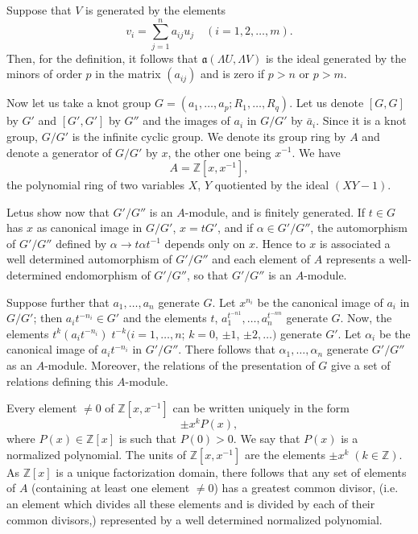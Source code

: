 Suppose that $V$ is generated by the elements  
$$
v_i = \sum^n_{j=1} a_{ij} u_j \quad (i= 1, 2, \ldots, m).
$$
Then, for the definition, it follows that $\mathfrak{a} (\Lambda U, \Lambda
V)$ is the ideal generated by the minors of order $p$ in the matrix
$(a_{ij})$ and is zero if $p> n$ or $p > m$. 

Now let us take a knot group $G = (a_1, \ldots, a_p; R_1, \ldots,
R_q)$. Let us denote $[G, G]$ by $G'$ and $[G', G']$ by $G''$ and the
images of $a_i$ in $G/G'$ by $\bar{a}_i$. Since it is a knot group, $G/
G'$ is the infinite cyclic group. We denote its group ring by $A$ and
denote a generator of $G/G'$ by $x$, the other one being $x^{-1}$. We
have  
$$
A = \mathbb{Z}[x, x^{-1}], 
$$
the polynomial ring of two variables $X$, $Y$ quotiented by the ideal
$(XY-1)$. 

Let\pageoriginale us show now that $G' / G''$ is an $A$-module, and is
finitely generated. If $t \in G$ has $x$ as canonical image in $G/ G'$,
$x = tG'$, and if $\alpha \in G' / G''$, the automorphism of $G'
/G''$ defined by $\alpha \to t \alpha t^{-1}$ depends only on 
$x$. Hence to $x$ is associated a well determined automorphism of $G'
/ G''$ and each element of $A$ represents a well-determined
endomorphism of $G' / G''$, so that $G' / G''$ is an $A$-module. 

Suppose further that $a_1, \ldots, a_n$ generate $G$. Let $x^{n_{i}}$
be the canonical image of $a_i$ in $G / G'$; then $a_i t^{-n_{i}} 
\in G'$ and the elements $t$,  $a_1^{t^{-n1}}, \ldots, a_n^{t^{-nn}}$
generate $G$. Now, the elements $t^k ( a_i t^{-n_{i}}) \;  t^{-k} (i =
1, \ldots, n$; $k= 0$, $\pm 1$, $\pm 2, \ldots)$ generate $G'$. Let
$\alpha_i$ be the canonical image of $a_i t^{-n_i}$ in $G' / G''$. There
follows that $\alpha_1, \ldots, \alpha_n$ generate $G' / G''$ as an
$A$-module. Moreover, the relations of the presentation of $G$ give a
set of relations defining this $A$-module. 

Every element $\neq 0$ of $\mathbb{Z} [x, x^{-1}]$ can be written
uniquely in the form  
$$
\pm x^k P(x), 
$$
where $P(x) \in \mathbb{Z}[x]$ is such that $P(0) > 0$. We say that
$P(x)$ is a normalized polynomial. The units of $\mathbb{Z} [ x,
  x^{-1}]$ are the elements $\pm x^k \; (k \in \mathbb{Z})$. As
$\mathbb{Z} [x]$ is a unique factorization domain, there follows that
any set of elements of $A$ (containing at least one element $\neq 0$)
has a greatest common divisor, (i.e. an element which divides all
these elements and is divided by each of their common divisors,)
represented by a well determined normalized polynomial. 

